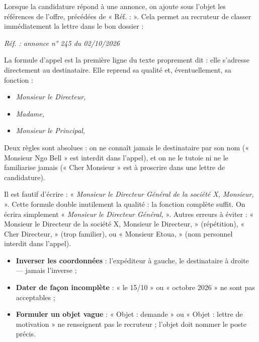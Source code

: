 \documentclass[11pt]{article}
\newcommand{\cle}[1]{{\popxbold\color{popdark}#1}}
\newcounter{popsec}
\newcounter{popsub}
\newcommand{\courssub}[1]{%
  \stepcounter{popsub}%
  \par\vspace{9pt}\noindent{\popxbold\fontsize{11.5}{13}\selectfont\color{popink}{\color{poporange}\thepopsec.\thepopsub}\hspace{6pt}#1}\par\nopagebreak\vspace{4pt}
}
\begin{document}
Lorsque la candidature répond à une annonce, on ajoute sous l'objet les \cle{références} de l'offre, précédées de « Réf. : ». Cela permet au recruteur de classer immédiatement la lettre dans le bon dossier :

\begin{center}
\emph{Réf. : annonce n° 245 du 02/10/2026}
\end{center}

\courssub{La formule d'appel}

La \cle{formule d'appel} est la première ligne du texte proprement dit : elle s'adresse directement au destinataire. Elle reprend sa qualité et, éventuellement, sa fonction :

\begin{itemize}
\item \emph{Monsieur le Directeur,}
\item \emph{Madame,}
\item \emph{Monsieur le Principal,}
\end{itemize}

Deux règles sont absolues : on ne connaît jamais le destinataire par son nom (« Monsieur Ngo Bell » est interdit dans l'appel), et on ne le tutoie ni ne le familiarise jamais (« Cher Monsieur » est à proscrire dans une lettre de candidature).

\begin{attention}
Il est fautif d'écrire : « \emph{Monsieur le Directeur Général de la société X, Monsieur,} ». Cette formule double inutilement la qualité : la fonction complète suffit. On écrira simplement « \emph{Monsieur le Directeur Général,} ». Autres erreurs à éviter : « Monsieur le Directeur de la société X, Monsieur le Directeur, » (répétition), « Cher Directeur, » (trop familier), ou « Monsieur Etoua, » (nom personnel interdit dans l'appel).
\end{attention}

\begin{attention}
\begin{itemize}
\item \textbf{Inverser les coordonnées} : l'expéditeur à gauche, le destinataire à droite — jamais l'inverse ;
\item \textbf{Dater de façon incomplète} : « le 15/10 » ou « octobre 2026 » ne sont pas acceptables ;
\item \textbf{Formuler un objet vague} : « Objet : demande » ou « Objet : lettre de motivation » ne renseignent pas le recruteur ; l'objet doit nommer le poste précis.
\end{itemize}
\end{attention}
\end{document}
